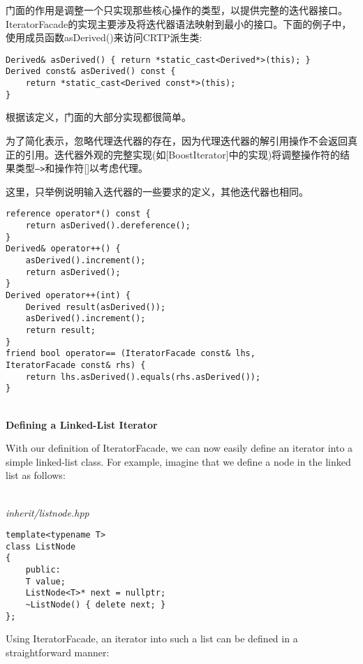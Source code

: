 门面的作用是调整一个只实现那些核心操作的类型，以提供完整的迭代器接口。IteratorFacade的实现主要涉及将迭代器语法映射到最小的接口。下面的例子中，使用成员函数asDerived()来访问CRTP派生类:

\begin{lstlisting}[style=styleCXX]
Derived& asDerived() { return *static_cast<Derived*>(this); }
Derived const& asDerived() const {
	return *static_cast<Derived const*>(this);
}
\end{lstlisting}

根据该定义，门面的大部分实现都很简单。

\begin{tcolorbox}[colback=webgreen!5!white,colframe=webgreen!75!black]
\hspace*{0.75cm}为了简化表示，忽略代理迭代器的存在，因为代理迭代器的解引用操作不会返回真正的引用。迭代器外观的完整实现(如[BoostIterator]中的实现)将调整操作符的结果类型\texttt{—>}和操作符[]以考虑代理。
\end{tcolorbox}

这里，只举例说明输入迭代器的一些要求的定义，其他迭代器也相同。

\begin{lstlisting}[style=styleCXX]
reference operator*() const {
	return asDerived().dereference();
}
Derived& operator++() {
	asDerived().increment();
	return asDerived();
}
Derived operator++(int) {
	Derived result(asDerived());
	asDerived().increment();
	return result;
}
friend bool operator== (IteratorFacade const& lhs,
IteratorFacade const& rhs) {
	return lhs.asDerived().equals(rhs.asDerived());
}
\end{lstlisting}

\hspace*{\fill} \\ %
\noindent
\textbf{Defining a Linked-List Iterator}

With our definition of IteratorFacade, we can now easily define an iterator into a simple linked-list class. For example, imagine that we define a node in the linked list as follows:

\hspace*{\fill} \\ %
\noindent
\textit{inherit/listnode.hpp}
\begin{lstlisting}[style=styleCXX]
template<typename T>
class ListNode
{
	public:
	T value;
	ListNode<T>* next = nullptr;
	~ListNode() { delete next; }
};
\end{lstlisting}

Using IteratorFacade, an iterator into such a list can be defined in a straightforward manner:

